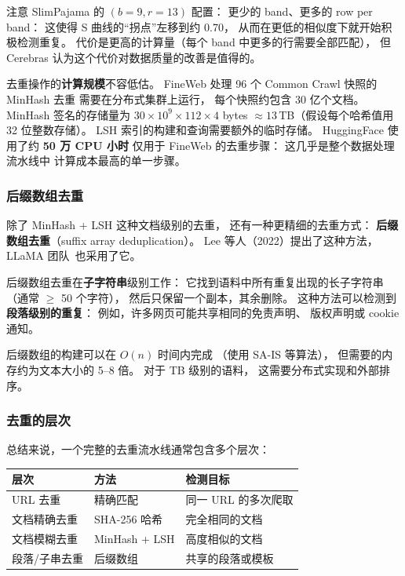 注意 SlimPajama 的 $(b=9, r=13)$ 配置：
更少的 band、更多的 row per band：
这使得 S 曲线的“拐点”左移到约 0.70，
从而在更低的相似度下就开始积极检测重复。
代价是更高的计算量（每个 band 中更多的行需要全部匹配），
但 Cerebras 认为这个代价对数据质量的改善是值得的。

去重操作的\textbf{计算规模}不容低估。
FineWeb 处理 96 个 Common Crawl 快照的 MinHash 去重
需要在分布式集群上运行，
每个快照约包含 30 亿个文档。
MinHash 签名的存储量为 $30 \times 10^9 \times 112 \times 4$ bytes
$\approx 13$\,TB（假设每个哈希值用 32 位整数存储）。
LSH 索引的构建和查询需要额外的临时存储。
HuggingFace 使用了约 \textbf{50 万 CPU 小时}
仅用于 FineWeb 的去重步骤：
这几乎是整个数据处理流水线中
计算成本最高的单一步骤。

\subsubsection{后缀数组去重}

除了 MinHash + LSH 这种文档级别的去重，
还有一种更精细的去重方式：
\textbf{后缀数组去重}（suffix array deduplication）。
Lee 等人（2022）提出了这种方法，
LLaMA 团队~\cite{touvron2023llama}也采用了它。

后缀数组去重在\textbf{子字符串}级别工作：
它找到语料中所有重复出现的长子字符串
（通常 $\geq$ 50 个字符），
然后只保留一个副本，其余删除。
这种方法可以检测到
\textbf{段落级别的重复}：
例如，许多网页可能共享相同的免责声明、
版权声明或 cookie 通知。

后缀数组的构建可以在 $O(n)$ 时间内完成
（使用 SA-IS 等算法），
但需要的内存约为文本大小的 5--8 倍。
对于 TB 级别的语料，
这需要分布式实现和外部排序。

\subsubsection{去重的层次}

总结来说，一个完整的去重流水线通常包含多个层次：

\begin{center}\small
\renewcommand{\arraystretch}{1.3}
\begin{tabular}{lll}
\toprule
\rowcolor{figLightGray}
\textbf{层次} & \textbf{方法} & \textbf{检测目标} \\
\midrule
URL 去重       & 精确匹配         & 同一 URL 的多次爬取 \\
文档精确去重   & SHA-256 哈希     & 完全相同的文档 \\
文档模糊去重   & MinHash + LSH    & 高度相似的文档 \\
段落/子串去重  & 后缀数组         & 共享的段落或模板 \\
\bottomrule
\end{tabular}
\end{center}

